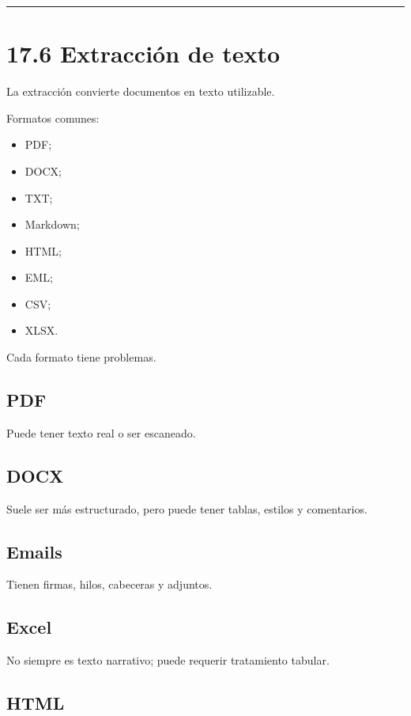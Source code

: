 \begin{center}\rule{0.5\linewidth}{0.5pt}\end{center}

\section{17.6 Extracción de texto}\label{extracciuxf3n-de-texto}

La extracción convierte documentos en texto utilizable.

Formatos comunes:

\begin{itemize}
\tightlist
\item
  PDF;
\item
  DOCX;
\item
  TXT;
\item
  Markdown;
\item
  HTML;
\item
  EML;
\item
  CSV;
\item
  XLSX.
\end{itemize}

Cada formato tiene problemas.

\subsection{PDF}\label{pdf}

Puede tener texto real o ser escaneado.

\subsection{DOCX}\label{docx}

Suele ser más estructurado, pero puede tener tablas, estilos y
comentarios.

\subsection{Emails}\label{emails}

Tienen firmas, hilos, cabeceras y adjuntos.

\subsection{Excel}\label{excel}

No siempre es texto narrativo; puede requerir tratamiento tabular.

\subsection{HTML}\label{html}

